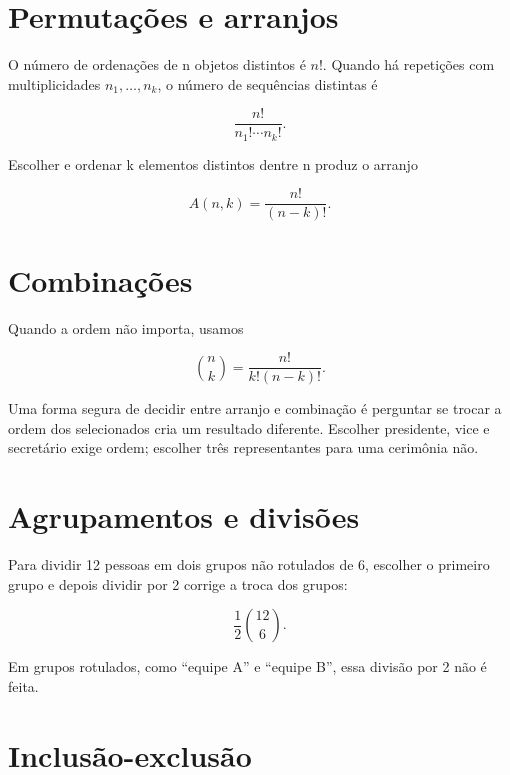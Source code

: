 \documentclass[12pt,a4paper,openany]{book}
\begin{document}
\section{Permutações e arranjos}



O número de ordenações de n objetos distintos é $n!$. Quando há repetições com multiplicidades $n_1,\ldots,n_k$, o número de sequências distintas é



\[\frac{n!}{n_1!\cdots n_k!}.\]



Escolher e ordenar k elementos distintos dentre n produz o arranjo



\[A(n,k)=\frac{n!}{(n-k)!}.\]



\section{Combinações}



Quando a ordem não importa, usamos



\[\binom{n}{k}=\frac{n!}{k!(n-k)!}.\]



Uma forma segura de decidir entre arranjo e combinação é perguntar se trocar a ordem dos selecionados cria um resultado diferente. Escolher presidente, vice e secretário exige ordem; escolher três representantes para uma cerimônia não.



\section{Agrupamentos e divisões}



Para dividir 12 pessoas em dois grupos não rotulados de 6, escolher o primeiro grupo e depois dividir por 2 corrige a troca dos grupos:



\[\frac{1}{2}\binom{12}{6}.\]



Em grupos rotulados, como “equipe A” e “equipe B”, essa divisão por 2 não é feita.



\section{Inclusão-exclusão}
\end{document}

